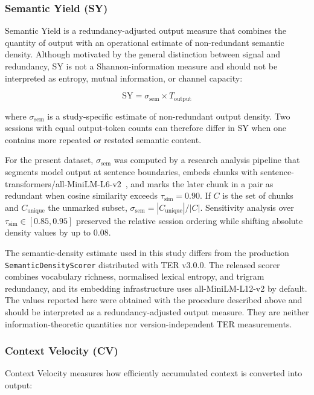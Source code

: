 \documentclass[journal]{IEEEtran}
\begin{document}
\subsubsection{Semantic Yield (SY)}

Semantic Yield is a redundancy-adjusted output measure that combines the quantity of output with an operational estimate of non-redundant semantic density. Although motivated by the general distinction between signal and redundancy, SY is not a Shannon-information measure and should not be interpreted as entropy, mutual information, or channel capacity:

\begin{equation}
\text{SY} = \sigma_{\text{sem}} \times T_{\text{output}}
\label{eq:it}
\end{equation}

\noindent where $\sigma_{\text{sem}}$ is a study-specific estimate of non-redundant output density. Two sessions with equal output-token counts can therefore differ in SY when one contains more repeated or restated semantic content.

For the present dataset, $\sigma_{\text{sem}}$ was computed by a research analysis pipeline that segments model output at sentence boundaries, embeds chunks with sentence-transformers/all-MiniLM-L6-v2~\cite{reimers2019}, and marks the later chunk in a pair as redundant when cosine similarity exceeds $\tau_{\text{sim}}=0.90$. If $C$ is the set of chunks and $C_{\text{unique}}$ the unmarked subset, $\sigma_{\text{sem}}=|C_{\text{unique}}|/|C|$. Sensitivity analysis over $\tau_{\text{sim}}\in[0.85,0.95]$ preserved the relative session ordering while shifting absolute density values by up to 0.08.

The semantic-density estimate used in this study differs from the production \texttt{SemanticDensityScorer} distributed with TER v3.0.0. The released scorer combines vocabulary richness, normalised lexical entropy, and trigram redundancy, and its embedding infrastructure uses all-MiniLM-L12-v2 by default. The values reported here were obtained with the procedure described above and should be interpreted as a redundancy-adjusted output measure. They are neither information-theoretic quantities nor version-independent TER measurements.

\subsubsection{Context Velocity (CV)}

Context Velocity measures how efficiently accumulated context is converted into output:
\end{document}
